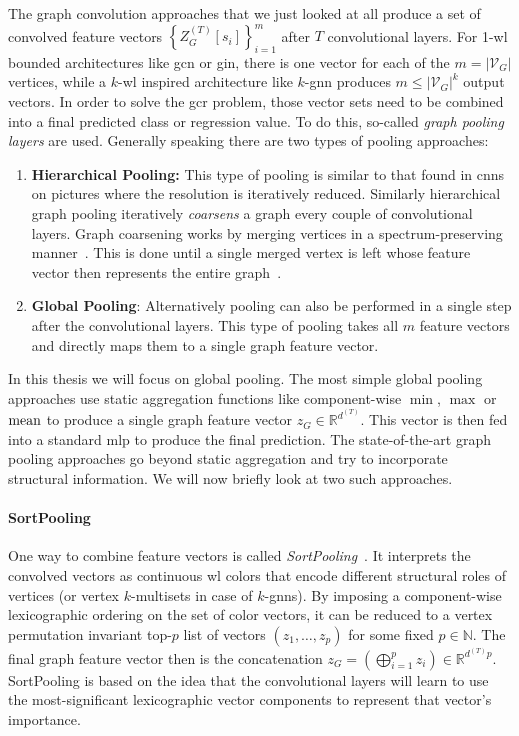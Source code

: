 The graph convolution approaches that we just looked at all produce a set of convolved feature vectors ${\left\{ Z_G^{(T)}[s_i] \right\}}_{i=1}^{m}$ after $T$ convolutional layers. %
For 1-\acs{wl} bounded architectures like \ac{gcn} or \ac{gin}, there is one vector for each of the $m = {|\mathcal{V}_G|}$ vertices, while a $k$-\acs{wl} inspired architecture like $k$-\acs{gnn} produces $m \leq {|\mathcal{V}_G|}^{k}$ output vectors.
In order to solve the \ac{gcr} problem, those vector sets need to be combined into a final predicted class or regression value.
To do this, so-called \textit{graph pooling layers} are used.
Generally speaking there are two types of pooling approaches:
\begin{enumerate}[label=\textbf{\arabic*.}]
	\item \textbf{Hierarchical Pooling:}
		This type of pooling is similar to that found in \acp{cnn} on pictures where the resolution is iteratively reduced.
		Similarly hierarchical graph pooling iteratively \textit{coarsens} a graph every couple of convolutional layers.
		Graph coarsening works by merging vertices in a spectrum-preserving manner~\cite{Loukas2018}.
		This is done until a single merged vertex is left whose feature vector then represents the entire graph~\cite{Ying2018}.
	\item \textbf{Global Pooling}:
		Alternatively pooling can also be performed in a single step after the convolutional layers.
		This type of pooling takes all $m$ feature vectors and directly maps them to a single graph feature vector.
\end{enumerate}
In this thesis we will focus on global pooling.
The most simple global pooling approaches use static aggregation functions like component-wise $\min$, $\max$ or $\operatorname{mean}$ to produce a single graph feature vector $z_G \in \mathbb{R}^{d^{(T)}}$.
This vector is then fed into a standard \ac{mlp} to produce the final prediction.
The state-of-the-art graph pooling approaches go beyond static aggregation and try to incorporate structural information.
We will now briefly look at two such approaches.

\paragraph{SortPooling}
One way to combine feature vectors is called \textit{SortPooling}~\cite{Zhang2018}.
It interprets the convolved vectors as continuous \ac{wl} colors that encode different structural roles of vertices (or vertex $k$-multisets in case of $k$-\acp{gnn}).
By imposing a component-wise lexicographic ordering on the set of color vectors, it can be reduced to a vertex permutation invariant top-$p$ list of vectors $(z_1, \dots, z_p)$ for some fixed $p \in \mathbb{N}$.
The final graph feature vector then is the concatenation $z_G = \left( \bigoplus_{i=1}^{p} z_i \right) \in \mathbb{R}^{d^{(T)} p}$.
SortPooling is based on the idea that the convolutional layers will learn to use the most-significant lexicographic vector components to represent that vector's importance.

